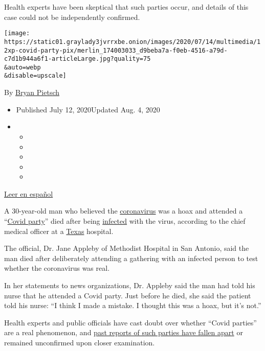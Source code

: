 Health experts have been skeptical that such parties occur, and details
of this case could not be independently confirmed.

\texttt{[image: https://static01.graylady3jvrrxbe.onion/images/2020/07/14/multimedia/12xp-covid-party-pix/merlin\_174003033\_d9beba7a-f0eb-4516-a79d-c7d1b944a6f1-articleLarge.jpg?quality=75\\\&auto=webp\\\&disable=upscale]}

By \href{https://www.nytimes3xbfgragh.onion/by/bryan-pietsch}{Bryan
Pietsch}

\begin{itemize}
\item
  Published July 12, 2020Updated Aug. 4, 2020
\item
  \begin{itemize}
  \item
  \item
  \item
  \item
  \item
  \end{itemize}
\end{itemize}

\href{https://www.nytimes3xbfgragh.onion/es/2020/07/13/espanol/mundo/fiesta-covid.html}{Leer
en español}

A 30-year-old man who believed the
\href{https://www.nytimes3xbfgragh.onion/2020/08/04/us/texas-coronavirus-rio-grande-valley-starr-county.html}{coronavirus}
was a hoax and attended a
``\href{https://www.nytimes3xbfgragh.onion/2020/08/07/arts/music/illegal-parties-coronavirus-europe.html}{Covid
party}'' died after being
\href{https://www.nytimes3xbfgragh.onion/2020/07/22/health/covid-antibodies-herd-immunity.html}{infected}
with the virus, according to the chief medical officer at a
\href{https://www.nytimes3xbfgragh.onion/2020/08/04/us/texas-coronavirus-rio-grande-valley-starr-county.html}{Texas}
hospital.

The official, Dr. Jane Appleby of Methodist Hospital in San Antonio,
said the man died after deliberately attending a gathering with an
infected person to test whether the coronavirus was real.

In her statements to news organizations, Dr. Appleby said the man had
told his nurse that he attended a Covid party. Just before he died, she
said the patient told his nurse: ``I think I made a mistake. I thought
this was a hoax, but it's not.''

Health experts and public officials have cast doubt over whether ``Covid
parties'' are a real phenomenon, and
\href{https://www.nytimes3xbfgragh.onion/2020/05/06/us/coronavirus-covid-parties.html}{past
reports of such parties have fallen apart} or remained unconfirmed upon
closer examination.

